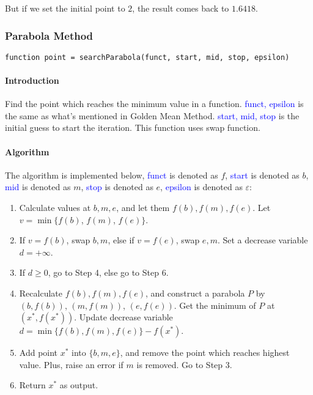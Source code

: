 \documentclass{article}
\begin{document}
But if we set the initial point to $2$, the result comes back to $1.6418$.

\subsubsection{Parabola Method}
\begin{verbatim}
function point = searchParabola(funct, start, mid, stop, epsilon)
\end{verbatim}

\paragraph{Introduction}
Find the point which reaches the minimum value in a function. \textcolor{blue}{funct, epsilon} is the same as what's mentioned in Golden Mean Method. \textcolor{blue}{start, mid, stop} is the initial guess to start the iteration. This function uses swap function.

\paragraph{Algorithm}
The algorithm is implemented below, \textcolor{blue}{funct} is denoted as $f$, \textcolor{blue}{start} is denoted as $b$, \textcolor{blue}{mid} is denoted as $m$, \textcolor{blue}{stop} is denoted as $e$, \textcolor{blue}{epsilon} is denoted as $\varepsilon$:
\begin{enumerate}
    \item Calculate values at $b, m, e$, and let them $f(b), f(m), f(e)$. Let $v = \min\{f(b)$, $f(m)$, $f(e)\}$.
    \item If $v = f(b)$, swap $b, m$, else if $v = f(e)$, swap $e, m$. Set a decrease variable $d = +\infty$.
    \item If $d \geqslant 0$, go to Step 4, else go to Step 6.
    \item Recalculate $f(b), f(m), f(e)$, and construct a parabola $P$ by $(b, f(b))$, $(m, f(m))$, $(e, f(e))$. Get the minimum of $P$ at $(x^*, f(x^*))$. Update decrease variable $d = \min{\{f(b), f(m), f(e)\}} - f(x^*)$.
    \item Add point $x^*$ into $\{b, m, e\}$, and remove the point which reaches highest value. Plus, raise an error if $m$ is removed. Go to Step 3.
    \item Return $x^*$ as output.
\end{enumerate}
\end{document}
